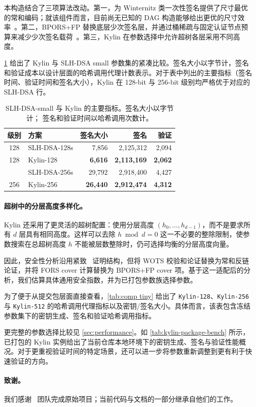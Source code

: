 本构造结合了三项算法改动。第一，\WOTSCS 为 Winternitz 类一次性签名提供了尺寸最优的常和编码；就该组件而言，目前尚无已知的 DAG 构造能够给出更优的尺寸效率~\cite{optimalwots}。第二，BPORS+FP 替换底层少次签名层，并通过桶稀疏与固定认证节点预算来减少少次签名载荷~\cite{bucketthinning}。第三，Kylin 在参数选择中允许超树各层采用不同高度。

\cref{tab:slh-kylin-small-comp} 给出了 Kylin 与 SLH-DSA small 参数集的紧凑比较。签名大小以字节计，签名和验证成本以设计层面的哈希调用代理计数表示。对于表中列出的主要指标（签名时间、验证时间和签名大小），Kylin 在 128-bit 与 256-bit 级别均严格优于对应的 SLH-DSA 行。

\begin{table}[t]
    \centering
    \caption{SLH-DSA-small 与 Kylin 的主要指标。签名大小以字节计；
    签名和验证时间以哈希调用次数计。}
    \label{tab:slh-kylin-small-comp}
    \small
    \setlength{\tabcolsep}{5pt}
    \begin{tabular}{@{}c l r r r@{}}
    \toprule
      级别 & 方案 & 签名大小 & 签名 & 验证 \\
      \midrule
      128 & SLH-DSA-128s & 7,856 & 2,125,312 & 2,094 \\
      128 & Kylin-128 & \textbf{6,616} & \textbf{2,113,169} & \textbf{2,062} \\
      \addlinespace[1pt]
      256 & SLH-DSA-256s & 29,792 & 2,918,400 & 4,427 \\
      256 & Kylin-256 & \textbf{26,440} & \textbf{2,912,474} & \textbf{4,312} \\
     \bottomrule
    \end{tabular}
\end{table}

\paragraph{超树中的分层高度多样化。}
Kylin 还采用了更灵活的超树配置：使用分层高度 $(h_0,\ldots,h_{d-1})$，而不是要求所有 $d$ 层具有相同高度。这样可以去除 $h \bmod d = 0$ 这一不必要的整除限制，使参数搜索在总超树高度 $h$ 不能被层数整除时，仍可选择均衡的分层高度向量。

因此，安全性分析沿用紧致 \SPHINCSP\ 证明结构，但将 WOTS 校验和论证替换为常和反链论证，并将 FORS cover 计算替换为 BPORS+FP cover 项。基于这一适配后的分析，我们估算具体通用安全指数，并为已打包参数族选择参数。

为了便于从提交包层面直接查看，\cref{tab:comp tiny} 给出了 \texttt{Kylin-128}、\texttt{Kylin-256} 与 \texttt{Kylin-512} 的哈希调用代理指标以及密钥/签名大小。具体而言，该表包含冻结参数集下的密钥生成、签名和验证哈希调用指标。

更完整的参数选择比较见 \cref{sec:performance}。如 \cref{tab:kylin-package-bench} 所示，已打包的 Kylin 实例给出了当前仓库本地环境下的密钥生成、签名与验证性能概况。对于更重视验证时间的特定场景，还可以进一步将参数重新调整到更有利于快速验证的方向。

\paragraph{致谢。}

我们感谢 \SPHINCSP\ 团队完成原始项目；当前代码与文档的一部分继承自他们的工作。
